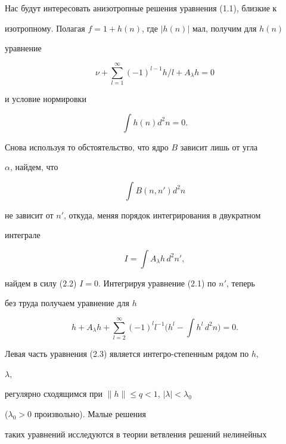 Нас будут интересовать анизотропные решения уравнения (1.1), близкие к


изотропному. Полагая $f=1+h(n)$, где $|h(n)|$ мал, получим для $h(n)$


уравнение


\begin{equation}


\nu+\sum^\infty_{l=1}(-1)^{l-1}h/l+A_\lambda h=0


\tag{2.1}


\end{equation}


и условие нормировки


\begin{equation}


\int h(n)d^2n=0.


\tag{2.2}


\end{equation}


Снова используя то обстоятельство, что ядро $B$ зависит лишь от угла


$\alpha$, найдем, что


$$


\int B(n,n')d^2n


$$


не зависит от $n'$, откуда, меняя порядок интегрирования в двукратном


интеграле


$$


I=\int A_\lambda h\,d^2n',


$$


найдем в силу (2.2)\; $I=0$. Интегрируя уравнение (2.1) по $n'$, теперь


без труда получаем уравнение для $h$


\begin{equation}


h+A_\lambda h+\sum^\infty_{l=2}(-1)^l l^{-1}


\biggl(h^l-\int h^l\,d^2n\biggr)=0.


\tag{2.3}


\end{equation}


Левая часть уравнения (2.3) является интегро-степенным рядом по $h$,


$\lambda$,


регулярно сходящимся при $\|h\|\le q<1$, $|\lambda|<\lambda_0$


($\lambda_0>0$ произвольно). Малые решения


таких уравнений исследуются в теории ветвления решений нелинейных



